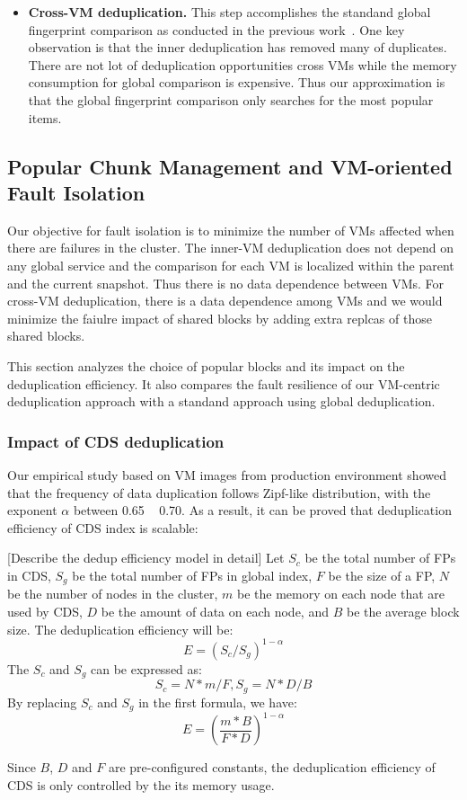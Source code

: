 \begin{itemize}
\item \textbf{Cross-VM deduplication.}
This step accomplishes the standand global fingerprint  comparison as conducted
in the previous work~\cite{??}.
One key observation is that the inner deduplication has removed many of duplicates.
There are not lot of deduplication opportunities cross VMs while the memory
consumption for global comparison is expensive.
Thus our approximation is that the global fingerprint  comparison  only searches for the most popular items. 
\end{itemize}

\subsection{Popular Chunk Management and VM-oriented Fault Isolation}
Our objective for fault isolation is to minimize the number of VMs affected when there are failures
in the cluster.  The inner-VM deduplication does not depend on any global service and the comparison
for each VM is localized within the parent and the current snapshot.
Thus there is no data dependence between VMs.
For cross-VM deduplication, there is a data dependence among VMs and we would minimize the faiulre impact
of shared blocks by adding extra replcas of those shared blocks.

This section analyzes the choice of popular blocks and its impact on the deduplication efficiency.
It also  compares the  fault resilience of our VM-centric deduplication approach with a standand approach using 
global deduplication.

\subsubsection{Impact of CDS deduplication}
Our empirical study based on VM images from production environment\cite{ieeecloud} showed that the
frequency of data duplication follows Zipf-like distribution\cite{zipf},
with the exponent $\alpha$ between 0.65 ~ 0.70.
As a result, it can be proved that deduplication efficiency of CDS index is scalable:

[Describe the dedup efficiency model in detail]
Let $S_c$ be the total number of FPs in CDS, $S_g$ be the total number of FPs in global index, $F$ be the size of a FP, $N$ be the number of nodes in the cluster, $m$ be the memory on each node that are used by CDS, $D$ be the amount of data on each node, and $B$ be the average block size. The deduplication efficiency will be:
\begin{equation}
  E = (S_c / S_g)^{1-\alpha}
\end{equation}
The $S_c$ and $S_g$ can be expressed as:
\begin{equation}
S_c = N*m/F, S_g = N*D/B
\end{equation}
By replacing $S_c$ and $S_g$ in the first formula, we have:
\begin{equation}
  E = (\frac{m*B}{F*D})^{1-\alpha}
\end{equation}

Since $B$, $D$ and $F$ are pre-configured constants, the deduplication efficiency of CDS is only controlled by the its memory usage.




